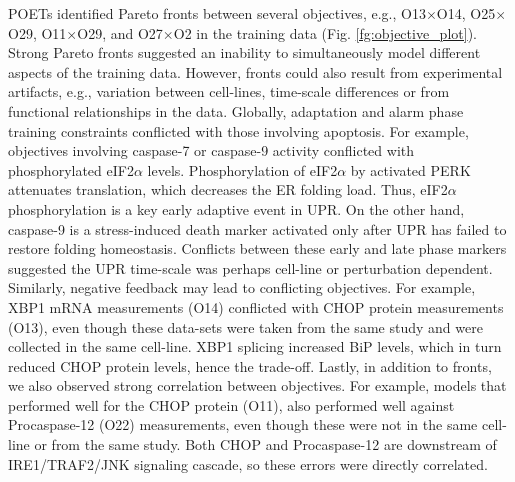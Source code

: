 \documentclass[fleqn,10pt]{wlscirep}
\begin{document}
POETs identified Pareto fronts between several objectives, e.g., O13$\times$O14, O25$\times$O29, O11$\times$O29, and O27$\times$O2 in the training data  (Fig. \ref{fg:objective_plot}). Strong Pareto fronts suggested an inability to simultaneously model different aspects of the training data. However, fronts could also result from experimental artifacts, e.g., variation between cell-lines, time-scale differences or from functional relationships in the data. Globally, adaptation and alarm phase training constraints conflicted with those involving apoptosis. For example, objectives involving caspase-7 or caspase-9 activity conflicted with phosphorylated eIF2$\alpha$ levels. Phosphorylation of eIF2$\alpha$ by activated PERK attenuates translation, which decreases the ER folding load. Thus, eIF2$\alpha$ phosphorylation is a key early adaptive event in UPR. On the other hand, caspase-9 is a stress-induced death marker activated only after UPR has failed to restore folding homeostasis. Conflicts between these early and late phase markers suggested the UPR time-scale was perhaps cell-line or perturbation dependent. Similarly, negative feedback may lead to conflicting objectives. For example, XBP1 mRNA measurements (O14) conflicted with CHOP protein measurements (O13), even though these data-sets were taken from the same study and were collected in the same cell-line. XBP1 splicing increased BiP levels, which in turn reduced CHOP protein levels, hence the trade-off. Lastly, in addition to fronts, we also observed strong correlation between objectives. For example, models that performed well for the CHOP protein (O11), also performed well against Procaspase-12 (O22) measurements, even though these were not in the same cell-line or from the same study. Both CHOP and Procaspase-12 are downstream of IRE1/TRAF2/JNK signaling cascade, so these errors were directly correlated.

\end{document}
